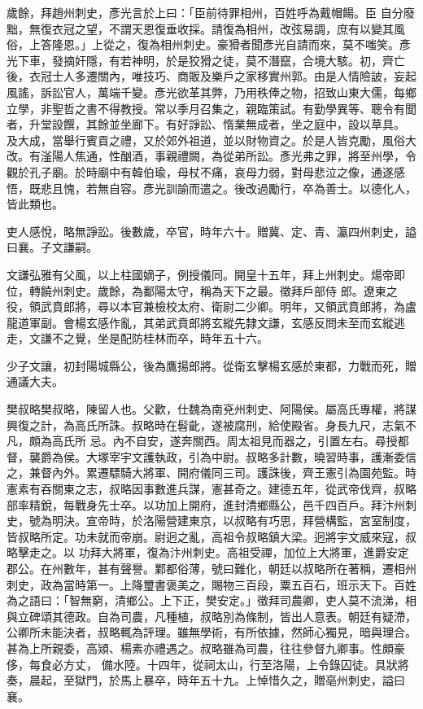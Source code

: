 \begin{pinyinscope}
 歲餘，拜趙州刺史，彥光言於上曰：「臣前待罪相州，百姓呼為戴帽餳。臣
 自分廢黜，無復衣冠之望，不謂天恩復垂收採。請復為相州，改弦易調，庶有以變其風俗，上答隆恩。」上從之，復為相州刺史。豪猾者聞彥光自請而來，莫不嗤笑。彥光下車，發摘奸隱，有若神明，於是狡猾之徒，莫不潛竄，合境大駭。初，齊亡後，衣冠士人多遷關內，唯技巧、商販及樂戶之家移實州郭。由是人情險詖，妄起風謠，訴訟官人，萬端千變。彥光欲革其弊，乃用秩俸之物，招致山東大儒，每鄉立學，非聖哲之書不得教授。常以季月召集之，親臨策試。有勤學異等、聰令有聞者，升堂設饌，其餘並坐廊下。有好諍訟、惰業無成者，坐之庭中，設以草具。
 及大成，當舉行賓貢之禮，又於郊外祖道，並以財物資之。於是人皆克勵，風俗大改。有滏陽人焦通，性酗酒，事親禮闕，為從弟所訟。彥光弗之罪，將至州學，令觀於孔子廟。於時廟中有韓伯瑜，母杖不痛，哀母力弱，對母悲泣之像，通遂感悟，既悲且愧，若無自容。彥光訓諭而遣之。後改過勵行，卒為善士。以德化人，皆此類也。



 吏人感悅，略無諍訟。後數歲，卒官，時年六十。贈冀、定、青、瀛四州刺史，謚曰襄。子文謙嗣。



 文謙弘雅有父風，以上柱國嫡子，例授儀同。開皇十五年，拜上州刺史。煬帝即位，轉饒州刺史。歲餘，為鄱陽太守，稱為天下之最。徵拜戶部侍
 郎。遼東之役，領武賁郎將，尋以本官兼檢校太府、衛尉二少卿。明年，又領武賁郎將，為盧龍道軍副。會楊玄感作亂，其弟武賁郎將玄縱先隸文謙，玄感反問未至而玄縱逃走，文謙不之覺，坐是配防桂林而卒，時年五十六。



 少子文讓，初封陽城縣公，後為鷹揚郎將。從衛玄擊楊玄感於東都，力戰而死，贈通議大夫。



 樊叔略樊叔略，陳留人也。父歡，仕魏為南兗州刺史、阿陽侯。屬高氏專權，將謀興復之計，為高氏所誅。叔略時在髫齔，遂被腐刑，給使殿省。身長九尺，志氣不凡，頗為高氏所
 忌。內不自安，遂奔關西。周太祖見而器之，引置左右。尋授都督，襲爵為侯。大塚宰宇文護執政，引為中尉。叔略多計數，曉習時事，護漸委信之，兼督內外。累遷驃騎大將軍、開府儀同三司。護誅後，齊王憲引為園苑監。時憲素有吞關東之志，叔略因事數進兵謀，憲甚奇之。建德五年，從武帝伐齊，叔略部率精銳，每戰身先士卒。以功加上開府，進封清鄉縣公，邑千四百戶。拜汴州刺史，號為明決。宣帝時，於洛陽營建東京，以叔略有巧思，拜營構監，宮室制度，皆叔略所定。功未就而帝崩。尉迥之亂，高祖令叔略鎮大梁。迥將宇文威來寇，叔略擊走之。以
 功拜大將軍，復為汴州刺史。高祖受禪，加位上大將軍，進爵安定郡公。在州數年，甚有聲譽。鄴都俗薄，號曰難化，朝廷以叔略所在著稱，遷相州刺史，政為當時第一。上降璽書褒美之，賜物三百段，粟五百石，班示天下。百姓為之語曰：「智無窮，清鄉公。上下正，樊安定。」徵拜司農卿，吏人莫不流涕，相與立碑頌其德政。自為司農，凡種植，叔略別為條制，皆出人意表。朝廷有疑滯，公卿所未能決者，叔略輒為評理。雖無學術，有所依據，然師心獨見，暗與理合。甚為上所親委，高熲、楊素亦禮遇之。叔略雖為司農，往往參督九卿事。性頗豪侈，每食必方丈，
 備水陸。十四年，從祠太山，行至洛陽，上令錄囚徒。具狀將奏，晨起，至獄門，於馬上暴卒，時年五十九。上悼惜久之，贈亳州刺史，謚曰襄。




\end{pinyinscope}
